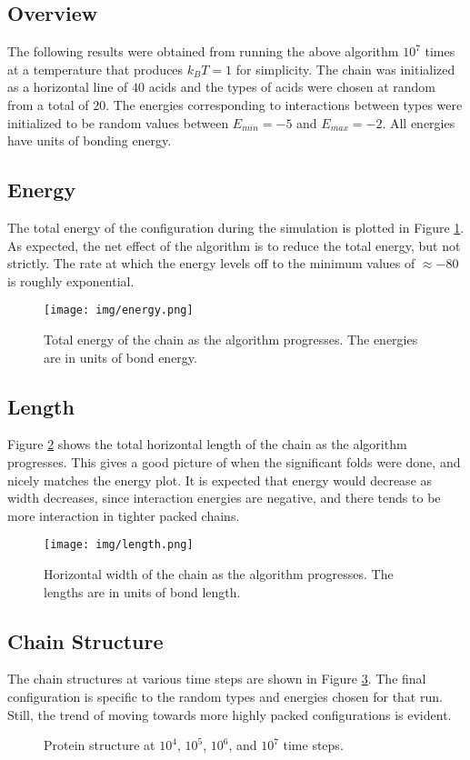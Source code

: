 \documentclass[12pt]{article}
\begin{document}
\subsection{Overview}
The following results were obtained from running the above algorithm $10^7$ times at a temperature that produces $k_B T = 1$ for simplicity. The chain was initialized as a horizontal line of $40$ acids and the types of acids were chosen at random from a total of $20$. The energies corresponding to interactions between types were initialized to be random values between $E_{min} = -5$ and $E_{max} = -2$. All energies have units of bonding energy.
\subsection{Energy}
The total energy of the configuration during the simulation is plotted in Figure \ref{f3}. As expected, the net effect of the algorithm is to reduce the total energy, but not strictly. The rate at which the energy levels off to the minimum values of $\approx -80$ is roughly exponential.
\begin{figure}
  \centering
  \texttt{[image: img/energy.png]}
  \caption{Total energy of the chain as the algorithm progresses. The energies are in units of bond energy.}
  \label{f3}
\end{figure}
\subsection{Length}
Figure \ref{f4} shows the total horizontal length of the chain as the algorithm progresses. This gives a good picture of when the significant folds were done, and nicely matches the energy plot. It is expected that energy would decrease as width decreases, since interaction energies are negative, and there tends to be more interaction in tighter packed chains.
\begin{figure}
  \centering
  \texttt{[image: img/length.png]}
  \caption{Horizontal width of the chain as the algorithm progresses. The lengths are in units of bond length.}
  \label{f4}
\end{figure}
\subsection{Chain Structure}
The chain structures at various time steps are shown in Figure \ref{f5}. The final configuration is specific to the random types and energies chosen for that run. Still, the trend of moving towards more highly packed configurations is evident.
\begin{figure}[H]
 \qquad
{} \qquad
{} \qquad
{} \qquad
\caption{Protein structure at $10^4$, $10^5$, $10^6$, and $10^7$ time steps.}
\label{f5}
\end{figure}
\clearpage
\end{document}
